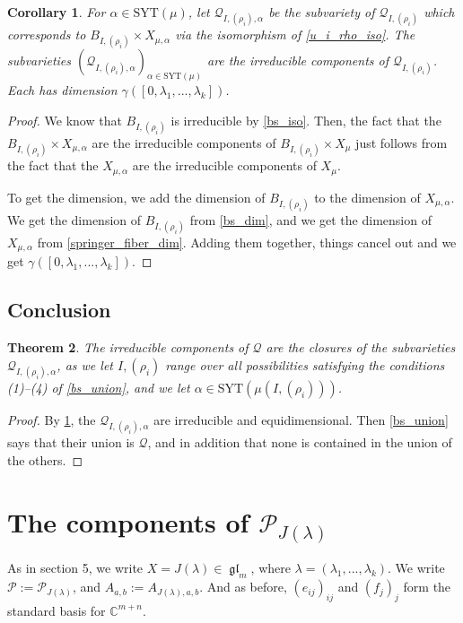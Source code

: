 \documentclass[12pt,psamsfonts]{article}
\DeclareMathOperator{\gl}{\mathfrak{gl}}
\newtheorem{theorem}{Theorem}[section]
\newtheorem{corollary}[theorem]{Corollary}
\begin{document}
\begin{corollary}\label{u_i_rho_irred_and_dim}
    For \(\alpha \in \mathrm{SYT}(\mu)\), let \(\mathcal{Q}_{I, (\rho_i), \alpha}\) be the subvariety of \(\mathcal{Q}_{I, (\rho_i)}\) which corresponds to \(B_{I, (\rho_i)} \times X_{\mu, \alpha}\) via the isomorphism of \cref{u_i_rho_iso}.
    The subvarieties \((\mathcal{Q}_{I, (\rho_i), \alpha})_{\alpha \in \mathrm{SYT}(\mu)}\) are the irreducible components of \(\mathcal{Q}_{I, (\rho_i)}\).
    Each has dimension \(\gamma([0, \lambda_1, ..., \lambda_k])\).
\end{corollary}
\begin{proof}
    We know that \(B_{I, (\rho_i)}\) is irreducible by \cref{bs_iso}.
    Then, the fact that the \(B_{I, (\rho_i)} \times X_{\mu, \alpha}\) are the irreducible components of \(B_{I, (\rho_i)} \times X_\mu\) just follows from the fact that the \(X_{\mu, \alpha}\) are the irreducible components of \(X_\mu\).
    \par To get the dimension, we add the dimension of \(B_{I, (\rho_i)}\) to the dimension of \(X_{\mu, \alpha}\).
    We get the dimension of \(B_{I, (\rho_i)}\) from \cref{bs_dim}, and we get the dimension of \(X_{\mu, \alpha}\) from \cref{springer_fiber_dim}.
    Adding them together, things cancel out and we get \(\gamma([0, \lambda_1, ..., \lambda_k])\).
\end{proof}

\subsection{Conclusion}
\begin{theorem}\label{Q_comps}
    The irreducible components of \(\mathcal{Q}\) are the closures of the subvarieties \(\mathcal{Q}_{I, (\rho_i), \alpha}\), as we let \(I, (\rho_i)\) range over all possibilities satisfying the conditions (1)--(4) of \cref{bs_union}, and we let \(\alpha \in \mathrm{SYT}(\mu(I, (\rho_i)))\).
\end{theorem}
\begin{proof}
    By \cref{u_i_rho_irred_and_dim}, the \(\mathcal{Q}_{I, (\rho_i), \alpha}\) are irreducible and equidimensional.
    Then \cref{bs_union} says that their union is \(\mathcal{Q}\), and in addition that none is contained in the union of the others.
\end{proof}

\section{The components of \texorpdfstring{\(\mathcal{P}_{J(\lambda)}\)}{P\_\{J(\textbackslash lambda)\}}}\label{p_comp}
As in section 5, we write \(X = J(\lambda) \in \gl_m\), where \(\lambda = (\lambda_1, ..., \lambda_k)\).
We write \(\mathcal{P} := \mathcal{P}_{J(\lambda)}\), and \(A_{a,b} := A_{J(\lambda), a, b}\).
And as before, \((e_{ij})_{ij}\) and \((f_j)_j\) form the standard basis for \(\mathbb{C}^{m + n}\).
\end{document}
